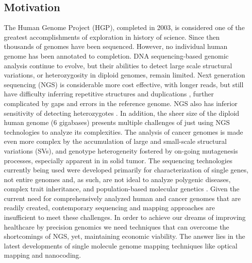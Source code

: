 \documentclass[11pt]{extarticle} %
\begin{document}
\subsection{Motivation}
The Human Genome Project (HGP), completed in 2003, is considered one of the greatest accomplishments of exploration in history of science. Since then thousands of genomes have been sequenced. However, no individual human genome has been annotated to completion. DNA sequencing-based genomic analysis continue to evolve, but their abilities to detect large scale structural variations, or heterozygosity in diploid genomes, remain limited. Next generation sequencing (NGS) is considerable more cost effective, with longer reads, but still have difficulty inferring repetitive structures and duplications \cite{Lander_etal_2001_Nature}, further complicated by gaps and errors in the reference genome. NGS also has inferior sensitivity of detecting heterozygotes \cite{Wheeler_etal_2008_Nature}. In addition, the sheer size of the diploid human genome (6 gigabases) presents multiple challenges of just using NGS technologies to analyze its complexities. The analysis of cancer genomes is made even more complex by the accumulation of large and small-scale structural variations (SVs), and genotype heterogeneity fostered by on-going mutagenesis processes, especially apparent in in solid tumor. The sequencing technologies currently being used were developed  primarily for characterization of single genes, not entire genomes and, as such, are not ideal to analyze polygenic diseases, complex trait inheritance, and population-based molecular genetics \cite{Samad_etal_1995_GenomeResearch}. Given the current need for comprehensively analyzed human and cancer genomes that are readily created, contemporary sequencing and mapping approaches are insufficient to meet these challenges. In order to achieve our dreams of improving healthcare by precision genomics we need techniques that can overcome the shortcomings of NGS, yet, maintaining economic viability. The answer lies in the latest developments of single molecule genome mapping techniques like optical mapping and nanocoding. 
\end{document}
